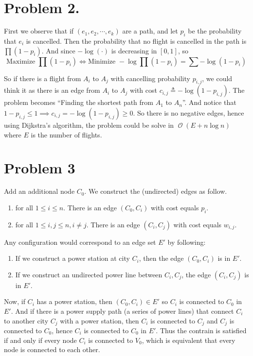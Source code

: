 \documentclass[12pt, a4paper]{article}
\newcommand{\opord}{\operatorname{\mathcal{O}}}
\newcommand{\ord}[1]{\opord\left(#1\right)}
\begin{document}
\section{Problem 2.}
First we observe that if $(e_1, e_2, \cdots, e_k)$ are a path, and let $p_i$ be the probability that $e_i$
is cancelled. Then the probability that no flight is cancelled in the path is $\prod (1 - p_i)$.
And since $-\log(\cdot)$ is decreasing in $[0, 1]$, so
\[ \text{Maximize } \prod (1 - p_i) \iff \text{Minimize } - \log \prod(1 - p_i) = \sum -\log(1 - p_i) \]

So if there is a flight from $A_i$ to $A_j$ with cancelling probability $p_{i,j}$, we could think it
as there is an edge from $A_i$ to $A_j$ with cost $c_{i,j} \triangleq - \log (1 - p_{i,j})$.
The problem becomes ``Finding the shortest path from $A_1$ to $A_n$''. And notice that
$1 - p_{i, j} \leq 1 \implies c_{i, j} = - \log(1 - p_{i, j}) \geq 0$. So there is no negative edges,
hence using Dijkstra's algorithm, the problem could be solve in $\ord{E + n \log n}$ where $E$ is the
number of flights.

\section{Problem 3}
Add an additional node $C_0$. We construct the (undirected) edges as follow.
\begin{enumerate}
  \item for all $1 \leq i \leq n$. There is an edge $(C_0, C_i)$ with cost equals $p_i$.
  \item for all $1 \leq i, j \leq n, i \neq j$. There is an edge $(C_i, C_j)$ with cost equals $w_{i, j}$.
\end{enumerate}
Any configuration would correspond to an edge set $E'$ by following: 
\begin{enumerate}
  \item If we construct a power station at city $C_i$, then the edge $(C_0, C_i)$ is in $E'$.
  \item If we construct an undirected power line between $C_i, C_j$, the edge $(C_i, C_j)$ is in $E'$.
\end{enumerate}

Now, if $C_i$ has a power station, then $(C_0, C_i) \in E'$ so $C_i$ is connected to $C_0$ in $E'$.
And if there is a power supply path (a series of power lines) that connect $C_i$ to another city $C_j$ with
a power station, then $C_i$ is connected to $C_j$ and $C_j$ is connected to $C_0$, hence $C_i$ is
connected to $C_0$ in $E'$. Thus the contrain is satisfied if and only if every node $C_i$ is connected
to $V_0$, which is equivalent that every node is connected to each other.
\end{document}
